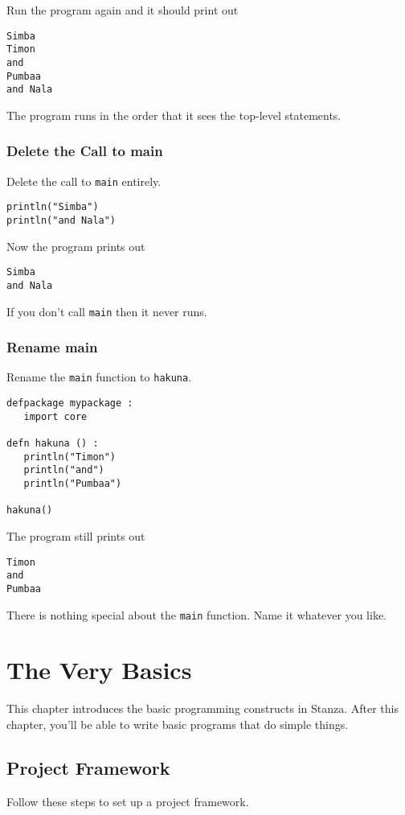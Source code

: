 \documentclass[10pt,oneside]{book}
\begin{document}
Run the program again and it should print out
\begin{lstlisting}
Simba
Timon
and
Pumbaa
and Nala
\end{lstlisting}

The program runs in the order that it sees the top-level statements.

\subsection*{Delete the Call to main}
Delete the call to \texttt{\frenchspacing main} entirely.
\begin{lstlisting}
println("Simba")
println("and Nala")
\end{lstlisting}

Now the program prints out
\begin{lstlisting}
Simba
and Nala
\end{lstlisting}

If you don't call \texttt{\frenchspacing main} then it never runs.

\subsection*{Rename main}
Rename the \texttt{\frenchspacing main} function to \texttt{\frenchspacing hakuna}. 
\begin{lstlisting}
defpackage mypackage :
   import core
   
defn hakuna () :
   println("Timon")
   println("and")
   println("Pumbaa")

hakuna()
\end{lstlisting}

The program still prints out
\begin{lstlisting}
Timon
and
Pumbaa
\end{lstlisting}

There is nothing special about the \texttt{\frenchspacing main} function. Name it whatever you like.

\chapter{The Very Basics}
This chapter introduces the basic programming constructs in Stanza. After this chapter, you'll be able to write basic programs that do simple things.

\section{Project Framework}
Follow these steps to set up a project framework.
\end{document}
